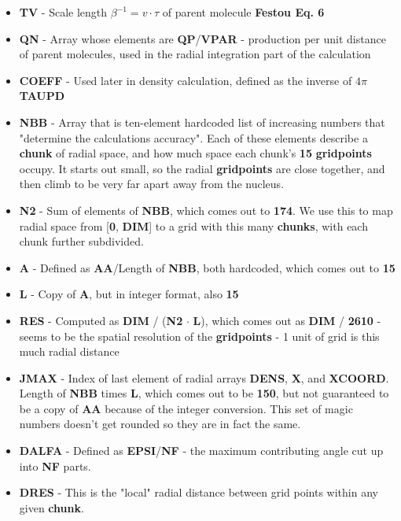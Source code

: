 \documentclass[11pt]{article}
\newcommand{\fortranvar}[1]{\textcolor{myblue}{\textbf{#1}}}
\newcommand{\mytodo}[1]{\colorbox{resultboxcol}{\textbf{#1}}}
\newcommand{\magicnumber}[1]{\textcolor{myred}{\textbf{#1}}}
\begin{document}
\begin{itemize}
    \item \fortranvar{TV} - Scale length \(\beta^{-1} = v \cdot \tau\) of parent molecule \mytodo{Festou Eq. 6}
    \item \fortranvar{QN} - Array whose elements are \fortranvar{QP}/\fortranvar{VPAR} - production per unit distance of parent molecules, used in the radial integration part of the calculation
    \item \fortranvar{COEFF} - Used later in density calculation, defined as the inverse of \(4 \pi\) \fortranvar{TAUPD}
    \item \fortranvar{NBB} - Array that is ten-element hardcoded list of increasing numbers that "determine the calculations accuracy".  Each of these elements describe a \textbf{chunk} of radial space, and how much space each chunk's \magicnumber{15} \textbf{gridpoints} occupy.  It starts out small, so the radial \textbf{gridpoints} are close together, and then climb to be very far apart away from the nucleus.
    \item \fortranvar{N2} - Sum of elements of \fortranvar{NBB}, which comes out to \magicnumber{174}.  We use this to map radial space from [\magicnumber{0}, \fortranvar{DIM}] to a grid with this many \textbf{chunks}, with each chunk further subdivided.
    \item \fortranvar{A} - Defined as \fortranvar{AA}/Length of \fortranvar{NBB}, both hardcoded, which comes out to \magicnumber{15}
    \item \fortranvar{L} - Copy of \fortranvar{A}, but in integer format, also \magicnumber{15}
    \item \fortranvar{RES} - Computed as \fortranvar{DIM} / (\fortranvar{N2} \(\cdot\) \fortranvar{L}), which comes out as \fortranvar{DIM} / \magicnumber{2610} - seems to be the spatial resolution of the \textbf{gridpoints} - 1 unit of grid is this much radial distance
    \item \fortranvar{JMAX} - Index of last element of radial arrays \fortranvar{DENS}, \fortranvar{X}, and \fortranvar{XCOORD}.  Length of \fortranvar{NBB} times \fortranvar{L}, which comes out to be \magicnumber{150}, but not guaranteed to be a copy of \fortranvar{AA} because of the integer conversion.  This set of magic numbers doesn't get rounded so they are in fact the same.
    \item \fortranvar{DALFA} - Defined as \fortranvar{EPSI}/\fortranvar{NF} - the maximum contributing angle cut up into \fortranvar{NF} parts.
    \item \fortranvar{DRES} - This is the "local" radial distance between grid points within any given \textbf{chunk}.
\end{itemize}
\end{document}
